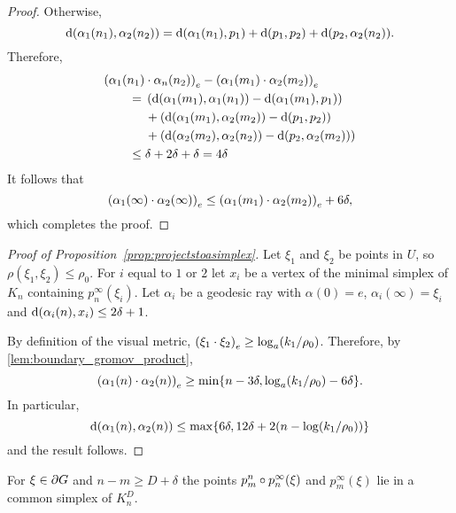 \documentclass[a4paper]{article}
\begin{document}
\begin{proof}
  Otherwise,
  \begin{equation*}
    \dist(\alpha_1(n_1), \alpha_2(n_2)) = \dist(\alpha_1(n_1), p_1) +
        \dist(p_1, p_2) + \dist(p_2, \alpha_2(n_2)).
  \end{equation*}
  Therefore,
  \begin{align*}
    \mathrlap{\gromov{e}{\alpha_1(n_1)}{\alpha_n(n_2)} - \gromov{e}{\alpha_1(m_1)}{\alpha_2(m_2)}}
    \quad\quad\phantom{{}={}}&\\
           &\mathllap{{}={}}\left(\dist(\alpha_1(m_1), \alpha_1(n_1)) - \dist(\alpha_1(m_1), p_1)\right) \\
           &+ \left(\dist(\alpha_1(m_1), \alpha_2(m_2)) - \dist(p_1, p_2)\right) \\
           &+ \left(\dist(\alpha_2(m_2), \alpha_2(n_2)) - \dist(p_2, \alpha_2(m_2))\right) \\
           &\mathllap{{}\leq{}} \delta+2\delta+\delta=4\delta 
  \end{align*}
  It follows that
  \begin{equation*}
    \gromov{e}{\alpha_1(\infty)}{\alpha_2(\infty)} \leq \gromov{e}{\alpha_1(m_1)}{\alpha_2(m_2)} + 6\delta,
  \end{equation*}
  which completes the proof.
\end{proof}

\begin{proof}[Proof of Proposition~\ref{prop:projectstoasimplex}] 
  Let $\xi_1$ and $\xi_2$ be points in $U$, so $\rho(\xi_1, \xi_2)
  \leq \rho_0$.  For $i$ equal to $1$ or $2$ let $x_i$ be a vertex of the
  minimal simplex of $K_n$ containing $p^\infty_n(\xi_i)$. Let $\alpha_i$ be a
  geodesic ray with $\alpha(0) = e$, $\alpha_i(\infty) = \xi_i$ and
  $\dist(\alpha_i(n), x_i) \leq 2\delta+1$. 
  
  By definition of the visual metric, $\gromov{e}{\xi_1}{\xi_2} \geq
  \log_a(k_1/\rho_0)$. Therefore, by \cref{lem:boundary_gromov_product},
  \begin{equation*}
    \gromov{e}{\alpha_1(n)}{\alpha_2(n)} \geq \min\{n - 3\delta, \log_a(k_1/\rho_0) - 6\delta\}.
  \end{equation*}
  In particular,
  \begin{equation*}
    \dist(\alpha_1(n), \alpha_2(n)) \leq \max\{6\delta, 12\delta + 2(n - \log(k_1/\rho_0))\}
  \end{equation*}
  and the result follows.
\end{proof}

\begin{lemma}
  For $\xi \in \boundary G$ and $n - m \geq D + \delta$ the points $p^n_m
  \composed p^\infty_n (\xi)$ and $p^\infty_m(\xi)$ lie in a common simplex of
  $K_n^D$.
\end{lemma}
\end{document}
